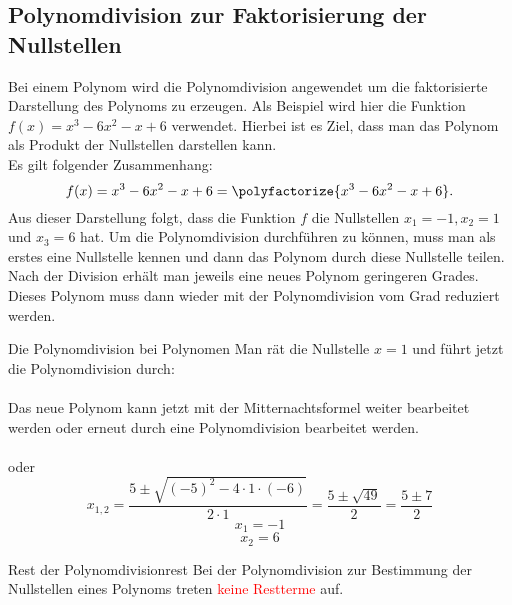 \subsection{Polynomdivision zur Faktorisierung der Nullstellen}\label{polynomdivision}
    Bei einem Polynom wird die Polynomdivision angewendet um die faktorisierte Darstellung des Polynoms zu erzeugen. Als Beispiel wird hier die Funktion $f(x) = x^3-6x^2-x+6$ verwendet. Hierbei ist es Ziel, dass man das Polynom als Produkt der Nullstellen darstellen kann.\\
    Es gilt folgender Zusammenhang: $$f(x) = x^3-6x^2-x+6 =  \polyfactorize{x^3-6x^2-x+6}.$$ Aus dieser Darstellung folgt, dass die Funktion $f$ die Nullstellen $x_1 = -1, x_2 = 1$ und $x_3= 6$ hat. Um die Polynomdivision durchführen zu können, muss man als erstes eine Nullstelle kennen und dann das Polynom durch diese Nullstelle teilen. Nach der Division erhält man jeweils eine neues Polynom geringeren Grades. Dieses Polynom muss dann wieder mit der Polynomdivision vom Grad reduziert werden.
    \begin{bsp}{Die Polynomdivision bei Polynomen}{} 
Man rät die Nullstelle $x=1$ und führt jetzt die Polynomdivision durch:\\
 \\
 Das neue Polynom kann jetzt mit der Mitternachtsformel weiter bearbeitet werden oder erneut durch eine Polynomdivision bearbeitet werden. \\
  \\
  oder
  $$ x_{1,2} = \dfrac{5\pm \sqrt{(-5)^2 - 4\cdot 1 \cdot (-6)}}{2\cdot 1} = \dfrac{5 \pm \sqrt{49} }{2} = \dfrac{5\pm 7}{2}$$
 $$ x_1 = -1$$
 $$ x_2= 6$$
\begin{center}
\end{center}
\end{bsp}
\begin{b8d}{Rest der Polynomdivision}{rest}
  Bei der Polynomdivision zur Bestimmung der Nullstellen eines Polynoms treten \textcolor{red}{keine Restterme} auf.   
\end{b8d}
